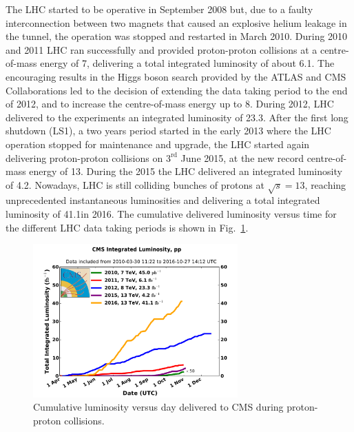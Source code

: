 The LHC started to be operative in September 2008 but, due to a faulty interconnection between two magnets that caused an explosive helium leakage in the tunnel, the operation was stopped and restarted in March 2010. During 2010 and 2011 LHC ran successfully and provided proton-proton collisions at a centre-of-mass energy of 7\TeV, delivering a total integrated luminosity of about 6.1\ifb. The encouraging results in the Higgs boson search provided by the ATLAS and CMS Collaborations led to the decision of extending the data taking period to the end of 2012, and to increase the centre-of-mass energy up to 8\TeV. During 2012, LHC delivered to the experiments an integrated luminosity of 23.3\ifb. After the first long shutdown (LS1), a two years period started in the early 2013 where the LHC operation stopped for maintenance and upgrade, the LHC started again delivering proton-proton collisions on $3^\mathrm{rd}$ June 2015, at the new record centre-of-mass energy of 13\TeV. During the 2015 the LHC delivered an integrated luminosity of 4.2\ifb. Nowadays, LHC is still colliding bunches of protons at $\sqrt{s}=13$\TeV, reaching unprecedented instantaneous luminosities and delivering a total integrated luminosity of 41.1\ifb in 2016. The cumulative delivered luminosity versus time for the different LHC data taking periods is shown in Fig.~\ref{fig:LHClumi}.

\begin{figure}[htb]
\centering
\includegraphics[width=0.7\textwidth]{images/LHClumi.pdf}
\caption{Cumulative luminosity versus day delivered to CMS during proton-proton collisions.}\label{fig:LHClumi}
\end{figure}

